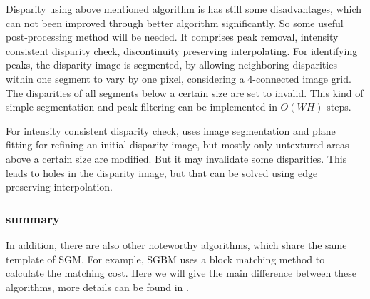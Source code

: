 Disparity using above mentioned algorithm is has still some disadvantages, which can not been improved through better algorithm significantly. So some useful post-processing method will be needed. It comprises peak removal, intensity consistent disparity check, discontinuity preserving interpolating. 
For identifying peaks, the disparity image is segmented, by allowing neighboring disparities within one segment to vary by one pixel, considering a 4-connected image grid. The disparities of all segments below a certain size are set to invalid. This kind of simple segmentation and peak filtering can be implemented in $O(WH)$ steps. 

For intensity consistent disparity check, uses image segmentation and plane fitting for refining an initial disparity image, but mostly only untextured areas above a certain size are modified. But it may invalidate some disparities. This leads to holes in the disparity image, but that can be solved using edge preserving interpolation. 

\subsubsection{summary}
\label{cha1 summary}
In addition, there are also other noteworthy algorithms, which share the same template of SGM. For example, SGBM uses a block matching method to calculate the matching cost. Here we will give the main difference between these algorithms, more details can be found in \cite{Hirschmüller07evaluationof}. 




